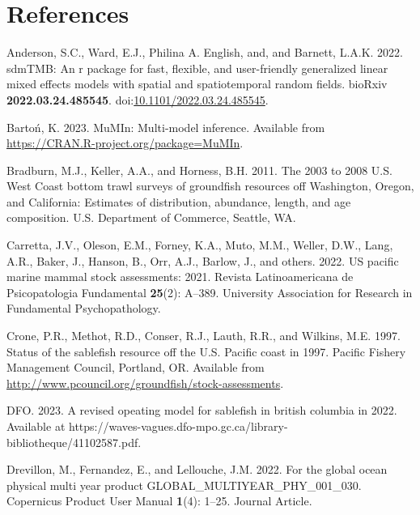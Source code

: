 \documentclass[
  english,
]{article}
\newlength{\cslhangindent}
\newenvironment{CSLReferences}[2] %
 {\begin{list}{}{%
  \setlength{\itemindent}{0pt}
  \setlength{\leftmargin}{0pt}
  \setlength{\parsep}{0pt}
  \ifodd #1
   \setlength{\leftmargin}{\cslhangindent}
   \setlength{\itemindent}{-1\cslhangindent}
  \fi
  \setlength{\itemsep}{#2\baselineskip}}}
 {\end{list}}
\begin{document}
\newpage{}

\section{References}\label{references}

\label{refs}
\begin{CSLReferences}{1}{0}
Anderson, S.C., Ward, E.J., Philina A. English, and, and Barnett, L.A.K.
2022. {sdmTMB}: An r package for fast, flexible, and user-friendly
generalized linear mixed effects models with spatial and spatiotemporal
random fields. bioRxiv \textbf{2022.03.24.485545}.
doi:\href{https://doi.org/10.1101/2022.03.24.485545}{10.1101/2022.03.24.485545}.

Bartoń, K. 2023. MuMIn: Multi-model inference. Available from
\url{https://CRAN.R-project.org/package=MuMIn}.

Bradburn, M.J., Keller, A.A., and Horness, B.H. 2011. The 2003 to 2008
{U}.{S}. {W}est {C}oast bottom trawl surveys of groundfish resources off
{W}ashington, {O}regon, and {C}alifornia: Estimates of distribution,
abundance, length, and age composition. {U}.{S}. Department of Commerce,
Seattle, WA.

Carretta, J.V., Oleson, E.M., Forney, K.A., Muto, M.M., Weller, D.W.,
Lang, A.R., Baker, J., Hanson, B., Orr, A.J., Barlow, J., and others.
2022. US pacific marine mammal stock assessments: 2021. Revista
Latinoamericana de Psicopatologia Fundamental \textbf{25}(2): A--389.
University Association for Research in Fundamental Psychopathology.

Crone, P.R., Methot, R.D., Conser, R.J., Lauth, R.R., and Wilkins, M.E.
1997. Status of the sablefish resource off the {U}.{S}. {P}acific coast
in 1997. Pacific Fishery Management Council, Portland, OR. Available
from \url{http://www.pcouncil.org/groundfish/stock-assessments}.

DFO. 2023. A revised opeating model for sablefish in british columbia in
2022. Available at
{https://waves-vagues.dfo-mpo.gc.ca/library-bibliotheque/41102587.pdf}.

Drevillon, M., Fernandez, E., and Lellouche, J.M. 2022. For the global
ocean physical multi year product GLOBAL\_MULTIYEAR\_PHY\_001\_030.
Copernicus Product User Manual \textbf{1}(4): 1--25. Journal Article.


\end{CSLReferences}
\end{document}
